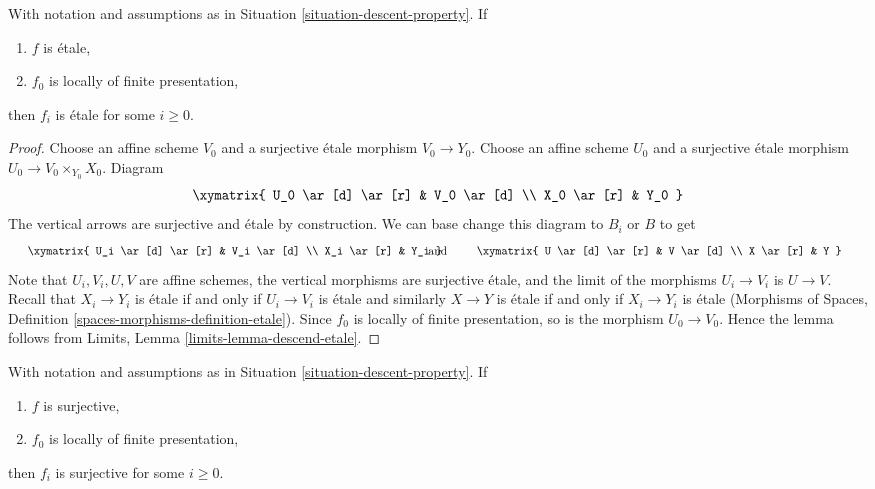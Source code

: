\begin{lemma}
\label{lemma-descend-etale}
With notation and assumptions as in
Situation \ref{situation-descent-property}. If
\begin{enumerate}
\item $f$ is \'etale,
\item $f_0$ is locally of finite presentation,
\end{enumerate}
then $f_i$ is \'etale for some $i \geq 0$.
\end{lemma}

\begin{proof}
Choose an affine scheme $V_0$ and a surjective \'etale morphism
$V_0 \to Y_0$. Choose an affine scheme $U_0$ and a surjective \'etale
morphism $U_0 \to V_0 \times_{Y_0} X_0$. Diagram
$$
\xymatrix{
U_0 \ar[d] \ar[r] & V_0 \ar[d] \\
X_0 \ar[r] & Y_0
}
$$
The vertical arrows are surjective and \'etale by construction.
We can base change this diagram to $B_i$ or $B$ to get
$$
\vcenter{
\xymatrix{
U_i \ar[d] \ar[r] & V_i \ar[d] \\
X_i \ar[r] & Y_i
}
}
\quad\text{and}\quad
\vcenter{
\xymatrix{
U \ar[d] \ar[r] & V \ar[d] \\
X \ar[r] & Y
}
}
$$
Note that $U_i, V_i, U, V$ are affine schemes,
the vertical morphisms are surjective \'etale, and the limit of the
morphisms $U_i \to V_i$ is $U \to V$. Recall that $X_i \to Y_i$ is \'etale
if and only if $U_i \to V_i$ is
\'etale and similarly $X \to Y$ is \'etale if and only if
$X_i \to Y_i$ is \'etale
(Morphisms of Spaces, Definition \ref{spaces-morphisms-definition-etale}).
Since $f_0$ is locally of finite
presentation, so is the morphism $U_0 \to V_0$. Hence the lemma follows
from Limits, Lemma \ref{limits-lemma-descend-etale}.
\end{proof}

\begin{lemma}
\label{lemma-descend-surjective}
With notation and assumptions as in
Situation \ref{situation-descent-property}. If
\begin{enumerate}
\item $f$ is surjective,
\item $f_0$ is locally of finite presentation,
\end{enumerate}
then $f_i$ is surjective for some $i \geq 0$.
\end{lemma}

